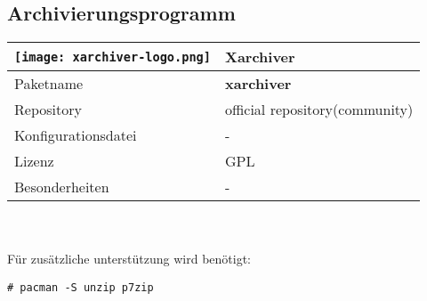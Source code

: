 \subsection{Archivierungsprogramm}
\begin{tabular}{l|l}
\texttt{[image: xarchiver-logo.png]} & Xarchiver \\ \hline
Paketname & \textbf{xarchiver} \\ 
Repository & official repository(community) \\
Konfigurationsdatei & - \\
Lizenz & GPL \\
Besonderheiten & - \\
\end{tabular}
\\ \\
Für zusätzliche unterstützung wird benötigt:
\begin{lstlisting}[style=Bash]
# pacman -S unzip p7zip 
\end{lstlisting}
